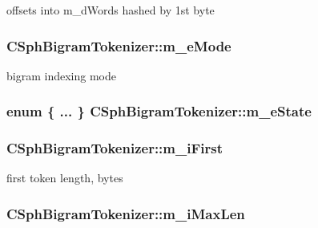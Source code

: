 offsets into m\-\_\-d\-Words hashed by 1st byte 

\hypertarget{classCSphBigramTokenizer_a07c3c025edb022bb4be3e6a959bcc9ba}{
\subsubsection[{m\-\_\-e\-Mode}]{ C\-Sph\-Bigram\-Tokenizer\-::m\-\_\-e\-Mode\hspace{0.3cm}{\ttfamily [protected]}}}\label{classCSphBigramTokenizer_a07c3c025edb022bb4be3e6a959bcc9ba}


bigram indexing mode 

\hypertarget{classCSphBigramTokenizer_a927126ea4786d959bb574ae2981b64e4}{
\subsubsection[{m\-\_\-e\-State}]{\setlength{\rightskip}{0pt plus 5cm}enum \{ ... \} 		 C\-Sph\-Bigram\-Tokenizer\-::m\-\_\-e\-State\hspace{0.3cm}{\ttfamily [protected]}}}\label{classCSphBigramTokenizer_a927126ea4786d959bb574ae2981b64e4}
\hypertarget{classCSphBigramTokenizer_a15614fd61426d2aa7e489adbd40e234f}{
\subsubsection[{m\-\_\-i\-First}]{ C\-Sph\-Bigram\-Tokenizer\-::m\-\_\-i\-First\hspace{0.3cm}{\ttfamily [protected]}}}\label{classCSphBigramTokenizer_a15614fd61426d2aa7e489adbd40e234f}


first token length, bytes 

\hypertarget{classCSphBigramTokenizer_a91b8c82bbaf189e3fdd87288ab75a050}{
\subsubsection[{m\-\_\-i\-Max\-Len}]{ C\-Sph\-Bigram\-Tokenizer\-::m\-\_\-i\-Max\-Len\hspace{0.3cm}{\ttfamily [protected]}}}\label{classCSphBigramTokenizer_a91b8c82bbaf189e3fdd87288ab75a050}


